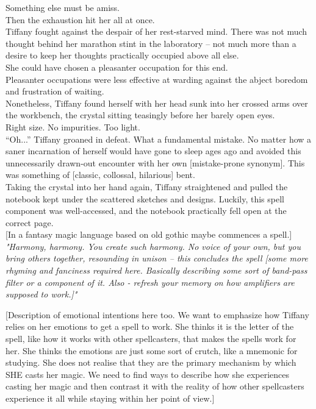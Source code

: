 Something else must be amiss.\\

Then the exhaustion hit her all at once.\\

Tiffany fought against the despair of her rest-starved mind.
There was not much thought behind her marathon stint in the laboratory -- not much more than a desire to keep her thoughts practically occupied above all else.\\

She could have chosen a pleasanter occupation for this end.\\

Pleasanter occupations were less effective at warding against the abject boredom and frustration of waiting.\\

Nonetheless, Tiffany found herself with her head sunk into her crossed arms over the workbench, the crystal sitting teasingly before her barely open eyes.\\

Right size.
No impurities.
Too light.\\

``Oh...'' Tiffany groaned in defeat.
What a fundamental mistake.
No matter how a saner incarnation of herself would have gone to sleep ages ago and avoided this unnecessarily drawn-out encounter with her own [mistake-prone synonym].
This was something of [classic, collossal, hilarious] bent.\\

Taking the crystal into her hand again, Tiffany straightened and pulled the notebook kept under the scattered sketches and designs. 
Luckily, this spell component was well-accessed, and the notebook practically fell open at the correct page.\\

[In a fantasy magic language based on old gothic maybe commences a spell.] 
\textit{"Harmony, harmony. You create such harmony. No voice of your own, but you bring others together, resounding in unison -- this concludes the spell 
[some more rhyming and fanciness required here. Basically describing some sort of band-pass filter or a component of it. Also - refresh your memory on how amplifiers are 
supposed to work.]"}

[Description of emotional intentions here too. We want to emphasize how Tiffany relies on her emotions to get a spell to work.
She thinks it is the letter of the spell, like how it works with other spellcasters, that makes the spells work for her. 
She thinks the emotions are just some sort of crutch, like a mnemonic for studying.
She does not realise that they are the primary mechanism by which SHE casts her magic.
We need to find ways to describe how she experiences casting her magic and then contrast it with the reality of how other spellcasters experience it all while staying within 
her point of view.]


